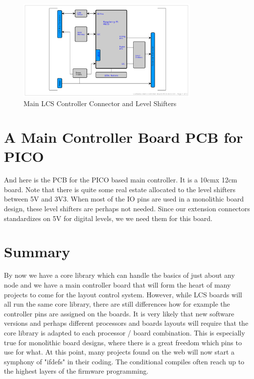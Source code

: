 \begin{figure}[htbp]
    \centering
    \includegraphics[page=3, width=0.8\textwidth]{./Schematics/Schematic_LcsNodes-Main-Controller-Board.pdf}
    \caption{Main LCS Controller Connector and Level Shifters}
\end{figure}
\FloatBarrier

\section{A Main Controller Board PCB for PICO}

And here is the PCB for the PICO based main controller. It is a 10cmx 12cm board. Note that there is quite some real estate allocated to the level shifters between 5V and 3V3. When most of the IO pins are used in a monolithic board design, these level shifters are perhaps not needed. Since our extension connectors standardizes on 5V for digital levels, we we need them for this board.

\FloatBarrier

\section{Summary}

By now we have a core library which can handle the basics of just about any node and we have a main controller board that will form the heart of many projects to come for the layout control system. However, while LCS boards will all run the same core library, there are still differences how for example the controller pins are assigned on the boards. It is very likely that new software versions and perhaps different processors and boards layouts will require that the core library is adapted to each processor / board combination. This is especially true for monolithic board designs, where there is a great freedom which pins to use for what. At this point, many projects found on the web will now start a symphony of "ifdefs" in their coding. The conditional compiles often reach up to the highest layers of the firmware programming. 

